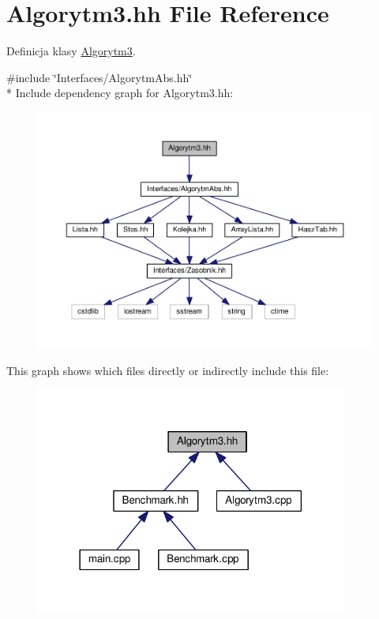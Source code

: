 \hypertarget{a00023}{}\section{Algorytm3.\+hh File Reference}
\label{a00023}


Definicja klasy \hyperlink{a00004}{Algorytm3}.  


{\ttfamily \#include \char`\"{}Interfaces/\+Algorytm\+Abs.\+hh\char`\"{}}\\*
Include dependency graph for Algorytm3.\+hh\+:
\nopagebreak
\begin{figure}[H]
\begin{center}
\leavevmode
\includegraphics[width=350pt]{a00060}
\end{center}
\end{figure}
This graph shows which files directly or indirectly include this file\+:
\nopagebreak
\begin{figure}[H]
\begin{center}
\leavevmode
\includegraphics[width=290pt]{a00061}
\end{center}
\end{figure}
